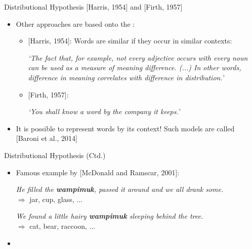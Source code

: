 \begin{frame}{Distributional Hypothesis [Harris, 1954] and [Firth, 1957]}{}
	\begin{itemize}
		\item Other approaches are based onto the :
		\begin{itemize}
			\item{} [Harris, 1954]: Words are similar if they occur in similar contexts:
			\vspace*{2mm}
			\begin{center}
				\textit{`The fact that, for example, not every adjective occurs with every noun can be used as a measure
				of meaning  difference. (...) In other words, difference in meaning correlates with difference in distribution.'}
			\end{center}
			\vspace*{2mm}
			\item{} [Firth, 1957]:
			\vspace*{2mm}
			\begin{center}
				\textit{`You shall know a word by the company it keeps.'}
			\end{center}
			\vspace*{2mm}
		\end{itemize}
		\item It is possible to represent words by its context! Such models are called 
			[Baroni et al., 2014]
	\end{itemize}
\end{frame}


\begin{frame}{Distributional Hypothesis (Ctd.)}{}
	\begin{itemize}
		\item Famous example by [McDonald and Ramscar, 2001]:
		\vspace*{2mm}
		\begin{center}
			\textit{He filled the \textbf{wampimuk}, passed it around and we all drank some.} \\
			$\Rightarrow$ jar, cup, glass, ...
		\end{center}
		\vspace*{2mm}
		\pause
		\begin{center}
			\textit{We found a little hairy \textbf{wampimuk} sleeping behind the tree.} \\
			$\Rightarrow$ cat, bear, raccoon, ...
		\end{center}
		\vspace*{2mm}
		\item {}
	\end{itemize}
\end{frame}


